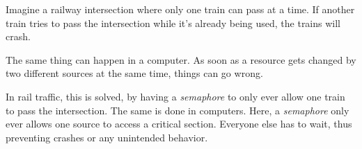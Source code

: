 
Imagine a railway intersection where only one train can pass at a time. If another train tries to pass the intersection while it's already being used, the trains will crash.

The same thing can happen in a computer. As soon as a resource gets changed by two different sources at the same time, things can go wrong.

In rail traffic, this is solved, by having a \emph{semaphore} to only ever allow one train to pass the intersection. The same is done in computers. Here, a \emph{semaphore} only ever allows one source to access a critical section. Everyone else has to wait, thus preventing crashes or any unintended behavior.

